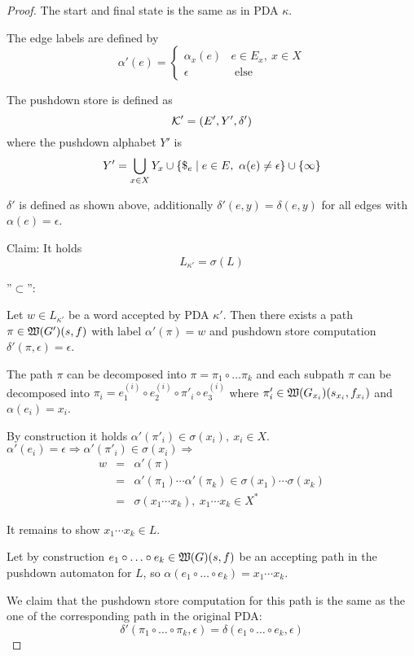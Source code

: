 \begin{proof}
The start and final state is the same as in PDA $\kappa$.

The edge labels are defined by
\[ \alpha'(e)= \begin{cases}
\alpha_x(e) & e \in E_x,\ x\in X \\
\epsilon & \text{ else}
\end{cases} \]

The pushdown store is defined as
\[ \mbox{$\mathcal{K}$}' = (E', Y', \delta') \]
where the pushdown alphabet $Y'$ is
\[ Y' = \bigcup_{x \in X} Y_x \cup \mbox{$\{{\$}_e \mid e \in E,\
\alpha(e)\neq\epsilon\}$} \cup \mbox{$\{\infty\}$} \]

$\delta'$ is defined as shown above, additionally $\delta'(e, y) = \delta(e,
y)$ for all edges with $\alpha(e)=\epsilon$.

Claim: It holds \[ L_{\kappa'} = \sigma(L) \]

''$\subset$'':

Let $w \in L_{\kappa'}$ be a word accepted by PDA $\kappa'$. Then
there exists a path $\pi \in \mbox{$\mathfrak{W}({G'})$}(s, f)$ with label
$\alpha'(\pi)=w$ and pushdown store computation $\delta'(\pi, \epsilon) =
\epsilon$.

The path $\pi$ can be decomposed into $\pi = \pi_1 \circ \ldots \pi_k$ and each
subpath $\pi$ can be decomposed into $\pi_i = e_1^{(i)} \circ e_2^{(i)}
\circ \pi'_i \circ e_3^{(i)}$ where $\pi'_i \in
\mbox{$\mathfrak{W}({G_{x_i}})$}(s_{x_i}, f_{x_i})$ and $\alpha(e_i) = x_i$.

By construction it holds $\alpha'(\pi'_i) \in \sigma(x_i),\ x_i \in X$.
$\alpha'(e_i) = \epsilon \Rightarrow \alpha'(\pi'_i) \in \sigma(x_i)
\Rightarrow$
\begin{eqnarray*}
w &=& \alpha'(\pi) \\
  &=& \alpha'(\pi_1) \cdots \alpha'(\pi_k) \in \sigma(x_1) \cdots \sigma(x_k) \\
  &=& \sigma(x_1 \cdots x_k),\ x_1 \cdots x_k \in X^*
\end{eqnarray*}

It remains to show $x_1 \cdots x_k \in L$.

Let by construction $e_1 \circ \ldots \circ e_k \in \mbox{$\mathfrak{W}({G})$}(s, f)$ be
an accepting path in the pushdown automaton for $L$, so $\alpha(e_1 \circ \ldots
\circ e_k) = x_1 \cdots x_k$.

We claim that the pushdown store computation for this path is the same as the
one of the corresponding path in the original PDA:
\[ \delta'(\pi_1 \circ \ldots \circ \pi_k, \epsilon) = \delta(e_1 \circ \ldots
\circ e_k, \epsilon) \]


\end{proof}

